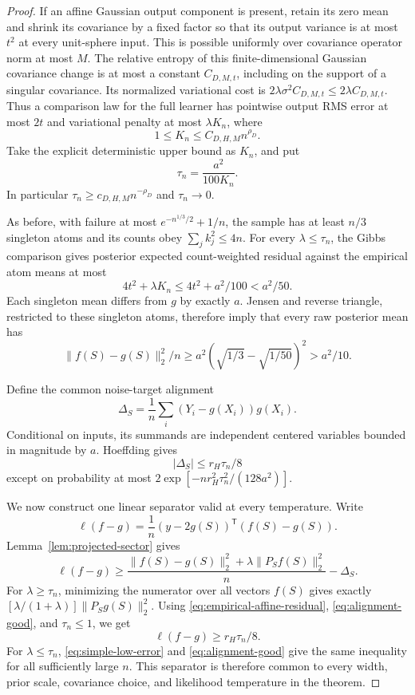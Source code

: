 \begin{proof}
If an affine Gaussian output component is present, retain its zero mean and shrink its covariance by a fixed factor so that its output variance is at most $t^2$ at every unit-sphere input. This is possible uniformly over covariance operator norm at most $M$. The relative entropy of this finite-dimensional Gaussian covariance change is at most a constant $C_{D,M,t}$, including on the support of a singular covariance. Its normalized variational cost is $2\lambda\sigma^2C_{D,M,t}\le2\lambda C_{D,M,t}$. Thus a comparison law for the full learner has pointwise output RMS error at most $2t$ and variational penalty at most $\lambda K_n$, where
\[
 1\le K_n\le C_{D,H,M}n^{\rho_D}.
\]
Take the explicit deterministic upper bound as $K_n$, and put
\[
 \tau_n=\frac{a^2}{100K_n}.
\]
In particular $\tau_n\ge c_{D,H,M}n^{-\rho_D}$ and $\tau_n\to0$.

As before, with failure at most $e^{-n^{1/3}/2}+1/n$, the sample has at least $n/3$ singleton atoms and its counts obey $\sum_jk_j^2\le4n$. For every $\lambda\le\tau_n$, the Gibbs comparison gives posterior expected count-weighted residual against the empirical atom means at most
\[
 4t^2+\lambda K_n\le4t^2+a^2/100<a^2/50.
\]
Each singleton mean differs from $g$ by exactly $a$. Jensen and reverse triangle, restricted to these singleton atoms, therefore imply that every raw posterior mean has
\begin{equation}
 \|f(S)-g(S)\|_2^2/n
 \ge a^2(\sqrt{1/3}-\sqrt{1/50})^2>a^2/10.
 \label{eq:simple-low-error}
\end{equation}

Define the common noise-target alignment
\[
 \Delta_S=\frac1n\sum_i(Y_i-g(X_i))g(X_i).
\]
Conditional on inputs, its summands are independent centered variables bounded in magnitude by $a$. Hoeffding gives
\begin{equation}
 |\Delta_S|\le r_H\tau_n/8
 \label{eq:alignment-good}
\end{equation}
except on probability at most $2\exp[-n r_H^2\tau_n^2/(128a^2)]$.

We now construct one linear separator valid at every temperature. Write
\[
 \ell(f-g)=\frac1n(y-2g(S))^{\mathsf T}(f(S)-g(S)).
\]
Lemma~\ref{lem:projected-sector} gives
\[
 \ell(f-g)\ge\frac{\|f(S)-g(S)\|_2^2+\lambda\|P_Sf(S)\|_2^2}{n}-\Delta_S.
\]
For $\lambda\ge\tau_n$, minimizing the numerator over all vectors $f(S)$ gives exactly
$[\lambda/(1+\lambda)]\|P_Sg(S)\|_2^2$.
Using \eqref{eq:empirical-affine-residual}, \eqref{eq:alignment-good}, and $\tau_n\le1$, we get
\[
 \ell(f-g)\ge r_H\tau_n/8.
\]
For $\lambda\le\tau_n$, \eqref{eq:simple-low-error} and \eqref{eq:alignment-good} give the same inequality for all sufficiently large $n$. This separator is therefore common to every width, prior scale, covariance choice, and likelihood temperature in the theorem.


\end{proof}
